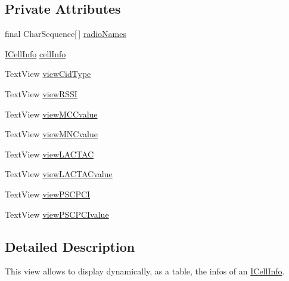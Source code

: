 \subsection*{Private Attributes}
\begin{DoxyCompactItemize}
\item 
final Char\-Sequence\mbox{[}$\,$\mbox{]} \hyperlink{classcom_1_1qualoutdoor_1_1recorder_1_1telephony_1_1ViewCellInfo_a4f4b692dc57bb398b89dda1b00bc9fa1}{radio\-Names}
\item 
\hyperlink{interfacecom_1_1qualoutdoor_1_1recorder_1_1telephony_1_1ICellInfo}{I\-Cell\-Info} \hyperlink{classcom_1_1qualoutdoor_1_1recorder_1_1telephony_1_1ViewCellInfo_af66b5ef483daa533f30f2ee851700656}{cell\-Info}
\item 
Text\-View \hyperlink{classcom_1_1qualoutdoor_1_1recorder_1_1telephony_1_1ViewCellInfo_a697d070234e3eec55fe8f912613217f9}{view\-Cid\-Type}
\item 
Text\-View \hyperlink{classcom_1_1qualoutdoor_1_1recorder_1_1telephony_1_1ViewCellInfo_a3225ef75cff62c8696bd3049e90fc387}{view\-R\-S\-S\-I}
\item 
Text\-View \hyperlink{classcom_1_1qualoutdoor_1_1recorder_1_1telephony_1_1ViewCellInfo_a3c41b1980987f286e0d2b70e96497e46}{view\-M\-C\-Cvalue}
\item 
Text\-View \hyperlink{classcom_1_1qualoutdoor_1_1recorder_1_1telephony_1_1ViewCellInfo_ad393e66a73ec04ac91a417fe1c278f95}{view\-M\-N\-Cvalue}
\item 
Text\-View \hyperlink{classcom_1_1qualoutdoor_1_1recorder_1_1telephony_1_1ViewCellInfo_addba4df5e73bb65b7b9ab54e340b3a6a}{view\-L\-A\-C\-T\-A\-C}
\item 
Text\-View \hyperlink{classcom_1_1qualoutdoor_1_1recorder_1_1telephony_1_1ViewCellInfo_af75d362066657bc8f00af69cb1a4b4dc}{view\-L\-A\-C\-T\-A\-Cvalue}
\item 
Text\-View \hyperlink{classcom_1_1qualoutdoor_1_1recorder_1_1telephony_1_1ViewCellInfo_a39951b826d7d9b34070f86a12df4ba0e}{view\-P\-S\-C\-P\-C\-I}
\item 
Text\-View \hyperlink{classcom_1_1qualoutdoor_1_1recorder_1_1telephony_1_1ViewCellInfo_a5f4d2fea79f9c4a1915c3988e11c875b}{view\-P\-S\-C\-P\-C\-Ivalue}
\end{DoxyCompactItemize}


\subsection{Detailed Description}
This view allows to display dynamically, as a table, the infos of an \hyperlink{interfacecom_1_1qualoutdoor_1_1recorder_1_1telephony_1_1ICellInfo}{I\-Cell\-Info}.

